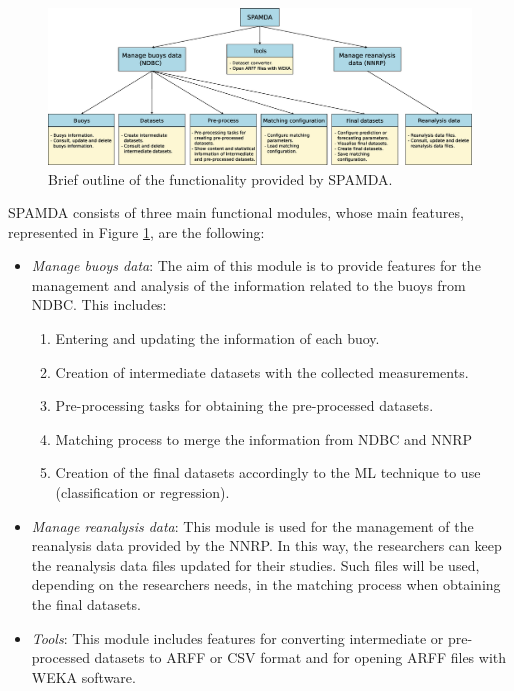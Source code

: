 \documentclass[energies,article,submit,moreauthors,pdftex]{Definitions/mdpi}
\begin{document}
		\begin{figure}[H]
			\centering
			\includegraphics[scale=0.32]{figures/FigureSPAMDA.eps}
			\caption{Brief outline of the functionality provided by SPAMDA.}
			\label{fig:SPAMDA}
		\end{figure}
		SPAMDA consists of three main functional modules, whose main features, represented in Figure \ref{fig:SPAMDA}, are the following:
		\begin{itemize}[leftmargin=*,labelsep=5.8mm]
			
			
			\item \textit{Manage buoys data}: The aim of this module is to provide features for the management and analysis of the information related to the buoys from NDBC. This includes:
			\begin{enumerate}[leftmargin=*,labelsep=4.9mm]
				\item Entering and updating the information of each buoy.
				\item Creation of intermediate datasets with the collected measurements.
				\item Pre-processing tasks for obtaining the pre-processed datasets.
				\item Matching process to merge the information from NDBC and NNRP
				\item Creation of the final datasets accordingly to the ML technique to use (classification or regression).
			\end{enumerate}
			
			\item \textit{Manage reanalysis data}: This module is used for the management of the reanalysis data provided by the NNRP. In this way, the researchers can keep the reanalysis data files updated for their studies. Such files will be used, depending on the researchers needs, in the matching process when obtaining the final datasets.
			
			\item \textit{Tools}: This module includes features for converting intermediate or pre-processed datasets to ARFF or CSV format and for opening ARFF files with WEKA software.
			
		\end{itemize}
\end{document}
